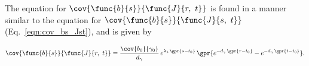 The equation for $\cov{\func{b}{s}}{\func{J}{r,\ t}}$ is found in a manner similar to the equation for $\cov{\func{b}{s}}{\func{J}{s,\ t}}$ (Eq.~\ref{eqn:cov_bs_Jst}), and is given by

\begin{equation}
    \cov{\func{b}{s}}{\func{J}{r,\ t}} = \frac{\cov{b_0}{\gamma_0}}{d_{\gamma}}\,e^{\lambda_{b}\,\gpr{s - t_0}}\,\gpr{e^{-d_{\gamma}\,\gpr{r - t_0}} - e^{-d_{\gamma}\,\gpr{t - t_0}}}. \label{eqn:cov_bs_Jrt}
\end{equation}
